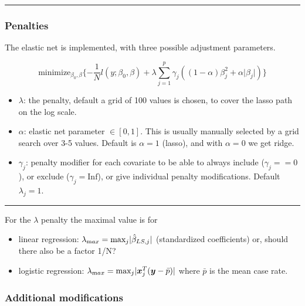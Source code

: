 \documentclass[
  letterpaper,
  DIV=11,
  numbers=noendperiod]{scrartcl}
\providecommand{\tightlist}{%
  \setlength{\itemsep}{0pt}\setlength{\parskip}{0pt}}\usepackage{longtable,booktabs,array}
\begin{document}
\begin{center}\rule{0.5\linewidth}{0.5pt}\end{center}

\hypertarget{penalties}{%
\subsubsection{Penalties}\label{penalties}}

The elastic net is implemented, with three possible adjustment
parameters.

\[ \text{minimize}_{\beta_0,\beta} \{ -\frac{1}{N} l(y;\beta_0,\beta)+\lambda \sum_{j=1}^p
\gamma_j ((1-\alpha)\beta_j^2+\alpha \lvert \beta_j \rvert)\}\]

\begin{itemize}
\tightlist
\item
  \(\lambda\): the penalty, default a grid of 100 values is chosen, to
  cover the lasso path on the log scale.
\item
  \(\alpha\): elastic net parameter \(\in [0,1]\). This is usually
  manually selected by a grid search over 3-5 values. Default is
  \(\alpha=1\) (lasso), and with \(\alpha=0\) we get ridge.
\item
  \(\gamma_j\): penalty modifier for each covariate to be able to always
  include (\(\gamma_j==0\)), or exclude (\(\gamma_j=\text{Inf}\)), or
  give individual penalty modifications. Default \(\lambda_j=1\).
\end{itemize}

\begin{center}\rule{0.5\linewidth}{0.5pt}\end{center}

For the \(\lambda\) penalty the maximal value is for

\begin{itemize}
\tightlist
\item
  linear regression:
  \(\lambda_{\text max}=\text{max}_j \lvert \hat{\beta}_{LS,j} \rvert\)
  (standardized coefficients) or, should there also be a factor 1/N?
\item
  logistic regression:
  \(\lambda_{\text max}=\text{max}_{j}\lvert {\boldsymbol x}_j ^T ({\boldsymbol y}-\bar{p}) \rvert\)
  where \(\bar p\) is the mean case rate.
\end{itemize}

\hypertarget{additional-modifications}{%
\subsubsection{Additional
modifications}\label{additional-modifications}}
\end{document}
